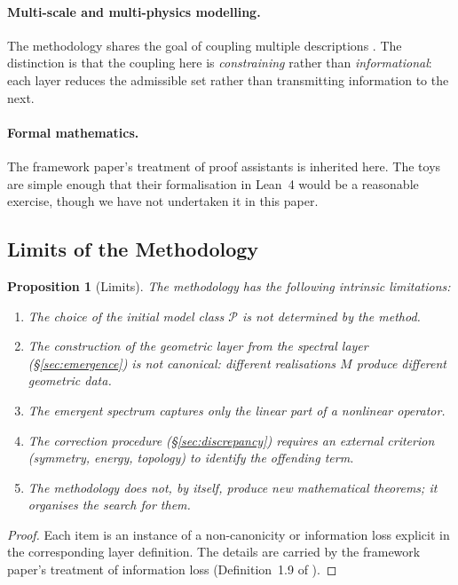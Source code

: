 \documentclass[11pt,a4paper]{article}
\theoremstyle{definition}
\theoremstyle{plain}
\newtheorem{proposition}[definition]{Proposition}
\begin{document}
\paragraph{Multi-scale and multi-physics modelling.}
The methodology shares the goal of coupling multiple descriptions
\cite{e-weinan}. The distinction is that the coupling here is
\emph{constraining} rather than \emph{informational}: each layer
reduces the admissible set rather than transmitting information to
the next.

\paragraph{Formal mathematics.}
The framework paper's treatment of proof assistants
\cite{mathlib} is inherited here. The toys are simple enough that
their formalisation in Lean~4 would be a reasonable exercise, though
we have not undertaken it in this paper.

\subsection{Limits of the Methodology}

\begin{proposition}[Limits]\label{prop:limits}
The methodology has the following intrinsic limitations:
\begin{enumerate}[label=(\alph*)]
  \item The choice of the initial model class $\mathcal P$ is not
        determined by the method.
  \item The construction of the geometric layer from the spectral
        layer (\S\ref{sec:emergence}) is not canonical: different
        realisations $M$ produce different geometric data.
  \item The emergent spectrum captures only the linear part of a
        nonlinear operator.
  \item The correction procedure (\S\ref{sec:discrepancy}) requires
        an external criterion (symmetry, energy, topology) to
        identify the offending term.
  \item The methodology does not, by itself, produce new
        mathematical theorems; it organises the search for them.
\end{enumerate}
\end{proposition}

\begin{proof}
Each item is an instance of a non-canonicity or information loss
explicit in the corresponding layer definition. The details are
carried by the framework paper's treatment of information loss
(Definition~1.9 of \cite{framework}).
\end{proof}
\end{document}
